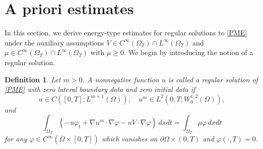 \documentclass{amsart}
\newtheorem{definition}[defn]{Definition}
\numberwithin{equation}{section}
\begin{document}



\section{A priori estimates}\label{S:apriori-est}

In this section, we derive energy-type estimates for regular solutions to \eqref{PME} under the auxiliary assumptions $V \in C^\infty(\Omega_{T})\cap L^\infty(\Omega_T)$ and $\mu \in C^\infty(\Omega_{T})\cap L^\infty(\Omega_T)$ with $\mu \ge0$.
We begin by introducing the notion of a regular solution.
\begin{definition}\label{reg sol}
Let $m>0$. A nonnegative function $u$ is called a regular solution of \eqref{PME} with zero lateral boundary data and zero initial data if
\[
u \in C([0,T];L^{m+1}(\Omega)), \quad u^{m} \in L^2(0,T;W_0^{1,2}(\Omega)),%
\]
and
\begin{equation}\label{reg sol1}
\int_{\Omega_T} \left\{ - u \varphi_t + \nabla u^m \cdot \nabla \varphi - uV \cdot \nabla \varphi \right\}\,dxdt
=
\int_{\Omega_T} \mu \varphi\,dxdt
\end{equation}
for any $\varphi \in C^{\infty} \left(\overline{\Omega} \times [0, T]\right)$ which vanishes on $\partial \Omega \times (0,T)$ and $\varphi(\cdot,T)=0$.
\end{definition}


\end{document}
